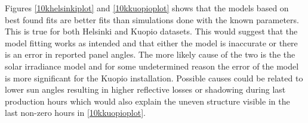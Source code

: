 \begin{figure}[h]
\begin{floatrow}
\end{floatrow}
\end{figure}


Figures \ref{10khelsinkiplot} and \ref{10kkuopioplot} shows that the models based on best found fits are better fits than simulations done with the known parameters. This is true for both Helsinki and Kuopio datasets. This would suggest that the model fitting works as intended and that either the model is inaccurate or there is an error in reported panel angles. The more likely cause of the two is the the solar irradiance model and for some undetermined reason the error of the model is more significant for the Kuopio installation. Possible causes could be related to lower sun angles resulting in higher reflective losses or shadowing during last production hours which would also explain the uneven structure visible in the last non-zero hours in \ref{10kkuopioplot}.



